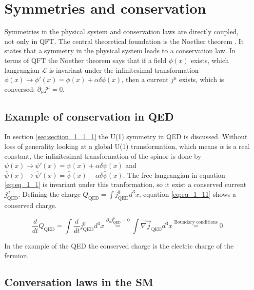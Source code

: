 \section{Symmetries and conservation}
\label{sec:section_1_2}

Symmetries in the physical system and conservation laws are directly coupled, not only in \gls{QFT}. The central theoretical foundation is the Noether theorem \cite{NOTHERTHEOREM}. It states that a symmetry in the physical system leads to a conservation law. In terms of \gls{QFT} the Noether theorem says that if a field $\phi(x)$ exists, which langrangian $\mathcal{L}$ is invariant under the infinitesimal transformation $\phi(x) \rightarrow \phi'(x) = \phi(x) + \alpha \delta \phi(x)$, then a current $j^{\mu}$ exists, which is conversed: $\partial_{\mu}j^{\mu} = 0$.  

\subsection{Example of conservation in \gls{QED}}
\label{sec:section_1_2_1}

In section \ref{sec:section_1_1_1} the U(1) symmetry in \gls{QED} is discussed. Without loss of generality looking at a global U(1) transformation, which means $\alpha$ is a real constant, the infinitesimal transformation of the spinor is done by $\psi(x) \rightarrow \psi'(x) = \psi(x) + \alpha \delta \psi(x)$ and  $\bar{\psi}(x) \rightarrow \bar{\psi}'(x) = \bar{\psi}(x) - \alpha \delta \bar{\psi}(x)$. The free langrangian in equation \ref{eq:eq_1_1} is invariant under this tranformation, so it exist a conserved current $j_{\text{QED}}^{\mu}$. Defining the charge $Q_{\text{QED}} = \int j^{0}_{\text{QED}} d^{3}x$, equation \ref{eq:eq_1_11} shows a conserved charge. 

\begin{equation}
	\label{eq:eq_1_11}
	\frac{d}{dt} Q_{\text{QED}} = \int \frac{d}{dt}j^{0}_{\text{QED}}d^{3}x \overset{\partial_{\mu}j_{\text{QED}}^{\mu} = 0}{=} \int \vec{\nabla} \vec{j}_{\text{QED}}d^{3}x \overset{\text{Boundary conditions}}{=} 0
\end{equation}

In the example of the \gls{QED} the conserved charge is the electric charge of the fermion.

\subsection{Conversation laws in the \gls{SM}}
\label{sec:section_1_2_2}


